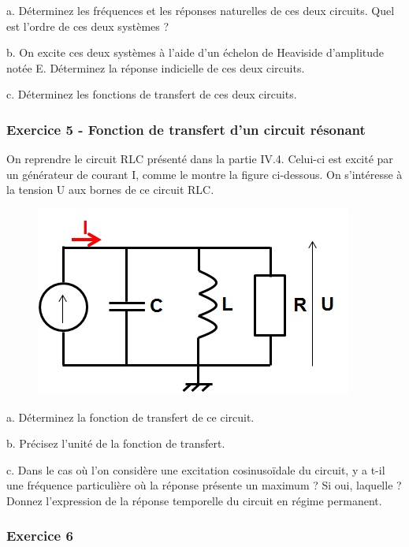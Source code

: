 \documentclass[]{book}
\begin{document}
{	a. Déterminez les fréquences et les réponses naturelles de ces deux circuits. Quel est l'ordre de ces deux systèmes ? 
	
	b. On excite ces deux systèmes à l'aide d'un échelon de Heaviside d'amplitude notée E. Déterminez la réponse indicielle de ces deux circuits. 
	
	c. Déterminez les fonctions de transfert de ces deux circuits.
	
	\vspace{1\baselineskip}
	
	\subsubsection{Exercice 5 - Fonction de transfert d'un circuit résonant}
	
	On reprendre le circuit RLC présenté dans la partie IV.4. Celui-ci est excité par un générateur de courant I, comme le montre la figure ci-dessous. On s'intéresse à la tension U aux bornes de ce circuit RLC. 
	
	\begin{figure}[h!]
		\centering
		\includegraphics[scale=0.5]{images/Exo_2_5.jpg} 
	\end{figure} 
	
	a. Déterminez la fonction de transfert de ce circuit. 
	
	b. Précisez l'unité de la fonction de transfert. 
	
	c. Dans le cas où l'on considère une excitation cosinusoïdale du circuit, y a t-il une fréquence particulière où la réponse présente un maximum ? Si oui, laquelle ? Donnez l'expression de la réponse temporelle du circuit en régime permanent.
	
	\vspace{1\baselineskip}
	
	\subsubsection{Exercice 6}
	
}
\end{document}
